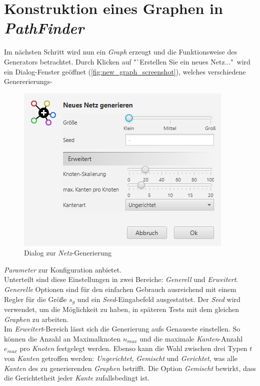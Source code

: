 \documentclass[12pt]{article}
\begin{document}
\section{Konstruktion eines Graphen in \textit{PathFinder}}
\label{sec:construct}
Im nächsten Schritt wird nun ein \textit{Graph} erzeugt und die Funktionsweise des Generators betrachtet. Durch Klicken auf "`Erstellen Sie ein neues Netz..."\ wird ein Dialog-Fenster geöffnet (\autoref{fig:new_graph_screenshot}), welches verschiedene Genererierungs-
\begin{figure}
\vspace{-20pt}
\begin{center}
\includegraphics[scale=0.6]{res/new_graph_screenshot.png}
\end{center}
\vspace{-20pt}
\centering
\caption{Dialog zur \textit{Netz}-Generierung}
\label{fig:new_graph_screenshot}
\end{figure}
\textit{Parameter} zur Konfiguration anbietet. 
\\
Unterteilt sind diese Einstellungen in zwei Bereiche: \textit{Generell} und \textit{Erweitert}. \textit{Generelle} Optionen sind für den einfachen Gebrauch ausreichend mit einem Regler für die Größe $s_g$ und ein \textit{Seed}-Eingabefeld ausgestattet. Der \textit{Seed} wird verwendet, um die Möglichkeit zu haben, in späteren Tests mit dem gleichen \textit{Graphen} zu arbeiten.
\\
Im \textit{Erweitert}-Bereich lässt sich die Generierung aufs Genaueste einstellen. So können die Anzahl an Maximalknoten $n_{max}$ und die maximale \textit{Kanten}-Anzahl $e_{max}$ pro \textit{Knoten} festgelegt werden. Ebenso kann die Wahl zwischen drei Typen $t$ von \textit{Kanten} getroffen werden: \textit{Ungerichtet}, \textit{Gemischt} und \textit{Gerichtet}, was alle \textit{Kanten} des zu generierenden \textit{Graphen} betrifft. Die Option \textit{Gemischt} bewirkt, dass die Gerichtetheit jeder \textit{Kante} zufallsbedingt ist.
\end{document}
